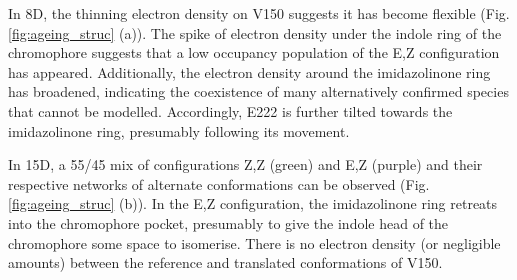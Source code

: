 \vspace{2mm}

In 8D, the thinning electron density on V150 suggests it has become flexible (Fig. \ref{fig:ageing_struc} (a)). The spike of electron density under the indole ring of the chromophore suggests that a low occupancy population of the E,Z configuration has appeared. Additionally, the electron density around the imidazolinone ring  has broadened, indicating the coexistence of many alternatively confirmed species that cannot be modelled. Accordingly, E222 is further tilted towards the imidazolinone ring, presumably following its movement.

In 15D, a 55/45 mix of configurations Z,Z (green) and E,Z (purple) and their respective networks of alternate conformations can be observed (Fig. \ref{fig:ageing_struc} (b)). In the E,Z configuration, the imidazolinone ring  retreats into the chromophore pocket, presumably to give the indole head of the chromophore some space to isomerise. There is no electron density (or negligible amounts) between the reference and translated conformations of V150. 


